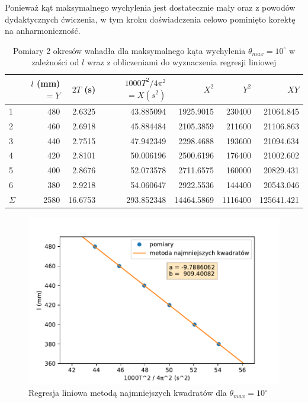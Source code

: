 \documentclass[a4paper]{article}
\begin{document}
Ponieważ kąt maksymalnego wychylenia jest dostatecznie mały oraz z powodów dydaktycznych ćwiczenia,
w tym kroku doświadczenia celowo pominięto korektę na anharmoniczność.

\begin{table}[h!]
\centering
	\begin{tabular}{lrrrrrr}
	\toprule
	{} & $l$ (mm) $=Y$ &  $2T$ (s) & \small$1000T^2/4\pi^2$\normalsize$=X (s^2)$ & $X^2$ & $Y^2$ & $XY$ \\
	\midrule
	1 &     480 &  2.6325 &  43.885094 &  1925.9015 &  230400 &  21064.845 \\
	2 &     460 &  2.6918 &  45.884484 &  2105.3859 &  211600 &  21106.863 \\
	3 &     440 &  2.7515 &  47.942349 &  2298.4688 &  193600 &  21094.634 \\
	4 &     420 &  2.8101 &  50.006196 &  2500.6196 &  176400 &  21002.602 \\
	5 &     400 &  2.8676 &  52.073578 &  2711.6575 &  160000 &  20829.431 \\
	6 &     380 &  2.9218 &  54.060647 &  2922.5536 &  144400 &  20543.046 \\
	\midrule
	$\Sigma$ & 2580 & 16.6753 & 293.852348 & 14464.5869 & 1116400 & 125641.421 \\
	\end{tabular}
\caption{Pomiary 2 okresów wahadła dla maksymalnego kąta wychylenia $\theta_{max} = 10^\circ$ w  zależności od $l$ wraz z obliczeniami do wyznaczenia regresji liniowej}
\label{pomiary_2}
\end{table}


\begin{figure}[h!]
\centering
	\includegraphics[scale=0.6]{wykres-3_0.pdf}
\caption{Regresja liniowa metodą najmniejszych kwadratów dla $\theta_{max} = 10^\circ$}
\label{regresja_10}
\end{figure}
\end{document}
